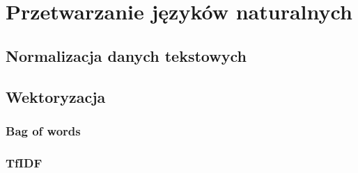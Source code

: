 \chapter{Przetwarzanie języków naturalnych}
\section{Normalizacja danych tekstowych}
\section{Wektoryzacja}
\subsection{Bag of words}
\subsection{TfIDF}
